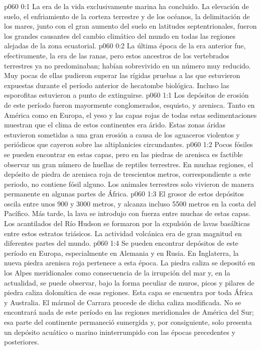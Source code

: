 \author{Portador de vida}
\vs p060 0:1 La era de la vida exclusivamente marina ha concluido. La elevación de suelo, el enfriamiento de la corteza terrestre y de los océanos, la delimitación de los mares, junto con el gran aumento del suelo en latitudes septentrionales, fueron los grandes causantes del cambio climático del mundo en todas las regiones alejadas de la zona ecuatorial.
\vs p060 0:2 La última época de la era anterior fue, efectivamente, la era de las ranas, pero estos ancestros de los vertebrados terrestres ya no predominaban; habían sobrevivido en un número muy reducido. Muy pocas de ellas pudieron superar las rígidas pruebas a las que estuvieron expuestas durante el período anterior de hecatombe biológica. Incluso las esporofitas estuvieron a punto de extinguirse.
\vs p060 1:1 Los depósitos de erosión de este período fueron mayormente conglomerados, esquisto, y arenisca. Tanto en América como en Europa, el yeso y las capas rojas de todas estas sedimentaciones muestran que el clima de estos continentes era árido. Estas zonas áridas estuvieron sometidas a una gran erosión a causa de los aguaceros violentos y periódicos que cayeron sobre las altiplanicies circundantes.
\vs p060 1:2 Pocos fósiles se pueden encontrar en estas capas, pero en las piedras de arenisca es factible observar un gran número de huellas de reptiles terrestres. En muchas regiones, el depósito de piedra de arenisca roja de trescientos metros, correspondiente a este periodo, no contiene fósil alguno. Los animales terrestres solo vivieron de manera permanente en algunas partes de África.
\vs p060 1:3 El grosor de estos depósitos oscila entre unos 900 y 3000 metros, y alcanza incluso 5500 metros en la costa del Pacífico. Más tarde, la lava se introdujo con fuerza entre muchas de estas capas. Los acantilados del Río Hudson se formaron por la expulsión de lavas basálticas entre estos estratos triásicos. La actividad volcánica era de gran magnitud en diferentes partes del mundo.
\vs p060 1:4 Se pueden encontrar depósitos de este período en Europa, especialmente en Alemania y en Rusia. En Inglaterra, la nueva piedra arenisca roja pertenece a esta época. La piedra caliza se depositó en los Alpes meridionales como consecuencia de la irrupción del mar y, en la actualidad, se puede observar, bajo la forma peculiar de muros, picos y pilares de piedra caliza dolomítica de esas regiones. Esta capa se encuentra por toda África y Australia. El mármol de Carrara procede de dicha caliza modificada. No se encontrará nada de este período en las regiones meridionales de América del Sur; esa parte del continente permaneció sumergida y, por consiguiente, solo presenta un depósito acuático o marino ininterrumpido con las épocas precedentes y posteriores.
